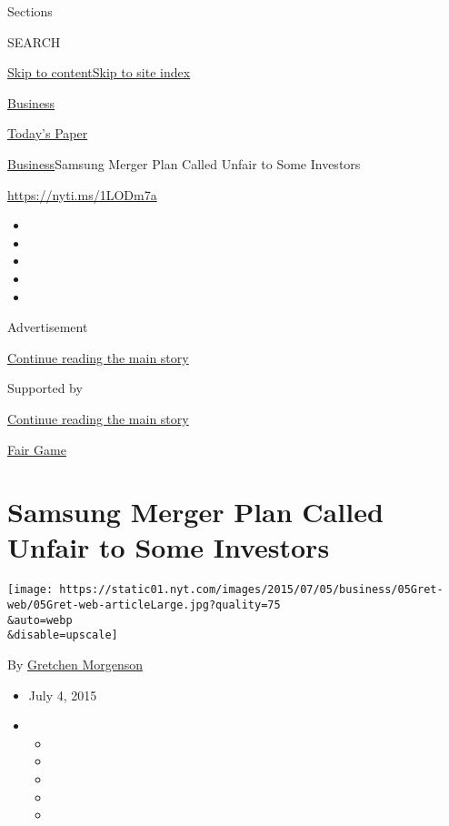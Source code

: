 Sections

SEARCH

\protect\hyperlink{site-content}{Skip to
content}\protect\hyperlink{site-index}{Skip to site index}

\href{https://www.nytimes.com/section/business}{Business}

\href{https://myaccount.nytimes.com/auth/login?response_type=cookie\&client_id=vi}{}

\href{https://www.nytimes.com/section/todayspaper}{Today's Paper}

\href{/section/business}{Business}\textbar{}Samsung Merger Plan Called
Unfair to Some Investors

\url{https://nyti.ms/1LODm7a}

\begin{itemize}
\item
\item
\item
\item
\item
\end{itemize}

Advertisement

\protect\hyperlink{after-top}{Continue reading the main story}

Supported by

\protect\hyperlink{after-sponsor}{Continue reading the main story}

\href{/column/fair-game}{Fair Game}

\hypertarget{samsung-merger-plan-called-unfair-to-some-investors}{%
\section{Samsung Merger Plan Called Unfair to Some
Investors}\label{samsung-merger-plan-called-unfair-to-some-investors}}

\texttt{[image: https://static01.nyt.com/images/2015/07/05/business/05Gret-web/05Gret-web-articleLarge.jpg?quality=75\\\&auto=webp\\\&disable=upscale]}

By \href{http://www.nytimes.com/by/gretchen-morgenson}{Gretchen
Morgenson}

\begin{itemize}
\item
  July 4, 2015
\item
  \begin{itemize}
  \item
  \item
  \item
  \item
  \item
  \end{itemize}
\end{itemize}

